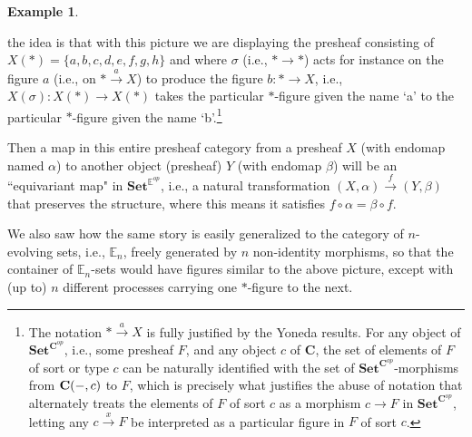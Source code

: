 \documentclass[11pt]{book}
\theoremstyle{definition}
\newtheorem{example}{Example}[section]
\theoremstyle{definition}
\theoremstyle{definition}
\theoremstyle{theorem}
\theoremstyle{definition}
\begin{document}
\begin{example}
\begin{center}
 \end{center}
		the idea is that with this picture we are displaying the presheaf consisting of $X(*) = \{a,b,c,d,e,f,g,h \}$ and where $\sigma$ (i.e., $* \rightarrow *$) acts for instance on the figure $a$ (i.e., on $* \xrightarrow{a} X$) to produce the figure $b: * \rightarrow X$, i.e., $X(\sigma): X(*) \rightarrow X(*)$ takes the particular $*$-figure given the name `a' to the particular $*$-figure given the name `b'.\footnote{The notation $* \xrightarrow{a} X$ is fully justified by the Yoneda results. For any object of $\textbf{Set}^{\textbf{C}^{op}}$, i.e., some presheaf $F$, and any object $c$ of $\textbf{C}$, the set of elements of $F$ of sort or type $c$ can be naturally identified with the set of $\textbf{Set}^{\textbf{C}^{op}}$-morphisms from $\textbf{C}(\--, c)$ to $F$, which is precisely what justifies the abuse of notation that alternately treats the elements of $F$ of sort $c$ as a morphism $c \rightarrow F$ in $\textbf{Set}^{\textbf{C}^{op}}$, letting any $c \xrightarrow{x} F$ be interpreted as a particular figure in $F$ of sort $c$.} \par
		Then a map in this entire presheaf category from a presheaf $X$ (with endomap named $\alpha$) to another object (presheaf) $Y$ (with endomap $\beta$) will be an ``equivariant map" in $\textbf{Set}^{\mathbb{E}^{op}}$, i.e., a natural transformation $(X, \alpha) \xrightarrow{f} (Y, \beta)$ that preserves the structure, where this means it satisfies $f \circ \alpha = \beta \circ f$. \par  
		We also saw how the same story is easily generalized to the category of $n$-evolving sets, i.e., $\mathbb{E}_n$, freely generated by $n$ non-identity morphisms, so that the container of $\mathbb{E}_n$-sets would have figures similar to the above picture, except with (up to) $n$ different processes carrying one $*$-figure to the next. \par 

\end{example}
\end{document}
